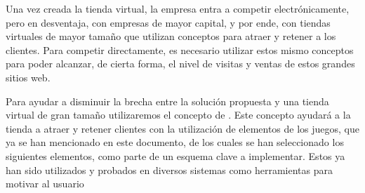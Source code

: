 Una vez creada la tienda virtual, la empresa entra a competir electrónicamente,
pero en desventaja, con empresas de mayor capital, y por ende, con tiendas virtuales
de mayor tamaño que utilizan conceptos para atraer y retener a los clientes.
Para competir directamente, es necesario utilizar estos mismo conceptos para
poder alcanzar, de cierta forma, el nivel de visitas y ventas de estos grandes
sitios web.

Para ayudar a disminuir la brecha entre la solución propuesta y una tienda virtual
de gran tamaño utilizaremos el concepto de {\GAM}.
Este concepto ayudará a la tienda a atraer y retener clientes con la utilización
de elementos de los juegos, que ya se han mencionado en este documento,
de los cuales se han seleccionado los siguientes elementos, como parte
de un esquema clave a implementar. Estos ya han sido utilizados y probados en diversos
sistemas como herramientas para motivar al usuario\cite{SocialMotivation}

